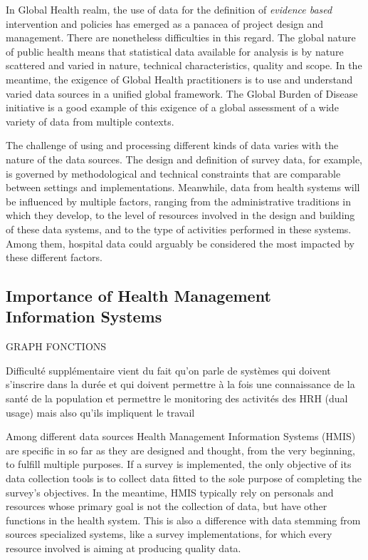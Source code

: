 \documentclass[a4paper,11pt,final,twoside]{article}
\begin{document}
In Global Health realm, the use of data for the definition of \textit{evidence based} intervention and policies has emerged as a panacea of project design and management. There are nonetheless difficulties in this regard. The global nature of public health means that statistical data available for analysis is by nature scattered and varied in nature, technical characteristics, quality and scope. In the meantime, the exigence of Global Health practitioners is to use and understand varied data sources in a unified global framework. The Global Burden of Disease initiative is a good example of this exigence of a global assessment of a wide variety of data from multiple contexts.

The challenge of using and processing different kinds of data varies with the nature of the data sources. The design and definition of survey data, for example, is governed by methodological and technical constraints that are comparable between settings and implementations. Meanwhile, data from health systems will be influenced by multiple factors, ranging from the administrative traditions in which they develop, to the level of resources involved in the design and building of these data systems, and to the type of activities performed in these systems. Among them, hospital data could arguably be considered the most impacted by these different factors.

\subsection{Importance of Health Management Information Systems}


GRAPH FONCTIONS


Difficulté supplémentaire vient du fait qu'on parle de systèmes qui doivent s'inscrire dans la durée et qui doivent permettre à la fois une connaissance de la santé de la population et permettre le monitoring des activités des HRH (dual usage) mais also qu'ils impliquent le travail


Among different data sources Health Management Information Systems (HMIS) are specific in so far as they are designed and thought, from the very beginning, to fulfill multiple purposes. If a survey is implemented, the only objective of its data collection tools is to collect data fitted to the sole purpose of completing the survey's objectives. In the meantime, HMIS typically rely on personals and resources whose primary goal is not the collection of data, but have other functions in the health system. This is also a difference with data stemming from sources specialized systems, like a survey implementations, for which every resource involved is aiming at producing quality data.
\end{document}
